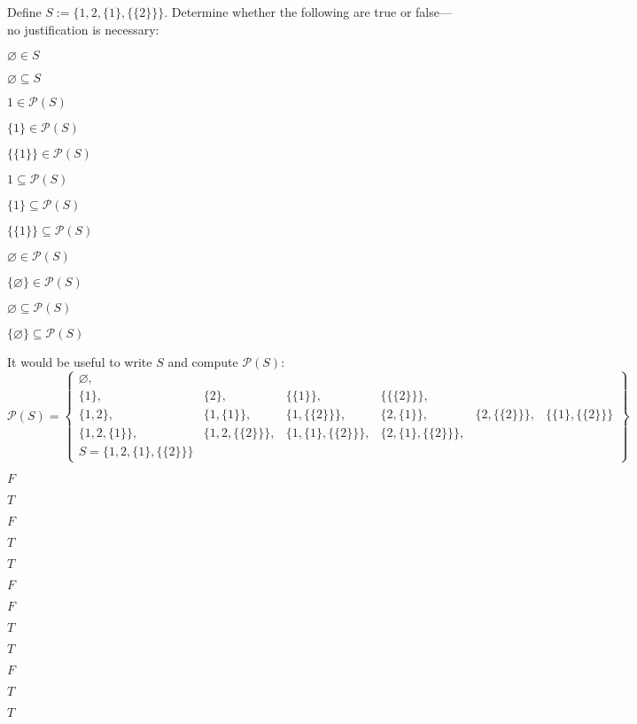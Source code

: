 \documentclass[11pt,letterpaper]{article}
\begin{document}
 Define $S:= \{ 1, 2, \{ 1 \}, \{ \{ 2 \} \} \}$. Determine whether the following are true or false---no justification is necessary:
	\begin{2enumerate}
	\item $\varnothing \in S$
	\item $\varnothing \subseteq S$
	\item $1 \in \mathcal{P}(S)$
	\item $\{ 1 \} \in \mathcal{P}(S)$
	\item $\{ \{ 1 \} \} \in \mathcal{P}(S)$
	\item $1 \subseteq \mathcal{P}(S)$
	\item $\{ 1 \} \subseteq \mathcal{P}(S)$
	\item $\{ \{ 1 \} \} \subseteq \mathcal{P}(S)$
	\item $\varnothing \in \mathcal{P}(S)$
	\item $\{ \varnothing \} \in \mathcal{P}(S)$
	\item $\varnothing \subseteq \mathcal{P}(S)$
	\item $\{ \varnothing \} \subseteq \mathcal{P}(S)$
	\end{2enumerate} \pspace

\sol It would be useful to write $S$ and compute $\mathcal{P}(S)$:
	\[
	\mathcal{P}(S)= 
	\left\{
	\begin{matrix}
	\varnothing, \\
	\{ 1 \}, & \{ 2 \}, & \{ \{ 1 \} \}, & \{ \{ \{ 2 \} \} \}, \\
	\{ 1, 2 \}, & \{ 1, \{ 1 \} \}, & \{ 1, \{ \{ 2 \} \} \}, & \{ 2, \{ 1 \} \}, & \{ 2, \{ \{ 2 \} \} \}, & \{ \{ 1 \}, \{ \{ 2 \} \} \} \\
	\{ 1, 2, \{ 1 \} \}, & \{ 1, 2, \{ \{ 2 \} \} \}, & \{ 1, \{ 1 \}, \{ \{ 2 \} \} \}, & \{ 2, \{ 1 \}, \{ \{ 2 \} \} \}, & \\
	S= \{ 1, 2, \{ 1 \}, \{ \{ 2 \} \} \}
	\end{matrix}
	\right\}
	\]
\begin{2enumerate}
\item $F$
\item $T$
\item $F$
\item $T$
\item $T$
\item $F$
\item $F$
\item $T$
\item $T$
\item $F$
\item $T$
\item $T$
\end{2enumerate}
\end{document}
